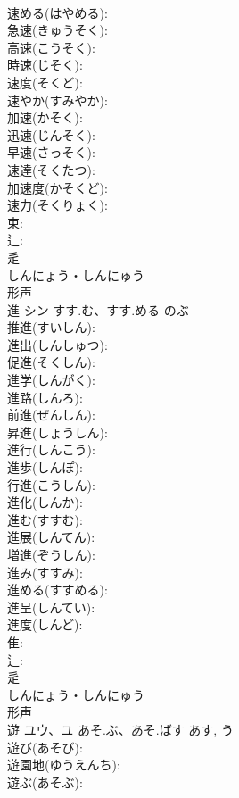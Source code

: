 \documentclass[8pt]{extreport}
\begin{document}
\begin{CJK}{UTF8}{min}
\\	速める(はやめる): 
\\	急速(きゅうそく): 
\\	高速(こうそく): 
\\	時速(じそく): 
\\	速度(そくど): 
\\	速やか(すみやか): 
\\	加速(かそく): 
\\	迅速(じんそく): 
\\	早速(さっそく): 
\\	速達(そくたつ): 
\\	加速度(かそくど): 
\\	速力(そくりょく): 
\\	束: 
\\	辶: 
\\	辵	
\\	しんにょう・しんにゅう	
\\	形声 
\\	進	シン	すす.む、すす.める	のぶ	
\\	推進(すいしん): 
\\	進出(しんしゅつ): 
\\	促進(そくしん): 
\\	進学(しんがく): 
\\	進路(しんろ): 
\\	前進(ぜんしん): 
\\	昇進(しょうしん): 
\\	進行(しんこう): 
\\	進歩(しんぽ): 
\\	行進(こうしん): 
\\	進化(しんか): 
\\	進む(すすむ): 
\\	進展(しんてん): 
\\	増進(ぞうしん): 
\\	進み(すすみ): 
\\	進める(すすめる): 
\\	進呈(しんてい): 
\\	進度(しんど): 
\\	隹: 
\\	辶: 
\\	辵	
\\	しんにょう・しんにゅう	
\\	形声 
\\	遊	ユウ、ユ	あそ.ぶ、あそ.ばす	あす, う	
\\	遊び(あそび): 
\\	遊園地(ゆうえんち): 
\\	遊ぶ(あそぶ): 

\end{CJK}
\end{document}
